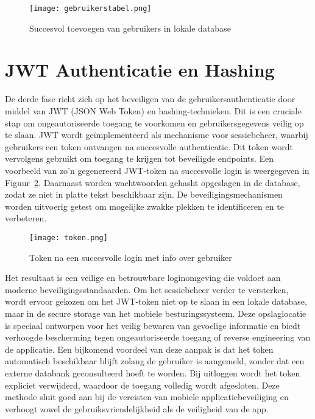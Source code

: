 \begin{figure}[H]
    \centering
    \texttt{[image: gebruikerstabel.png]}
    \caption{Succesvol toevoegen van gebruikers in lokale database}
    \label{fig:gebruikerstabel}
\end{figure}

\section{JWT Authenticatie en Hashing}

De derde fase richt zich op het beveiligen van de gebruikersauthenticatie door middel van JWT (JSON Web Token) en hashing-technieken. Dit is een cruciale stap om ongeautoriseerde toegang te voorkomen en gebruikersgegevens veilig op te slaan. JWT wordt geïmplementeerd als mechanisme voor sessiebeheer, waarbij gebruikers een token ontvangen na succesvolle authenticatie. Dit token wordt vervolgens gebruikt om toegang te krijgen tot beveiligde endpoints. Een voorbeeld van zo’n gegenereerd JWT-token na succesvolle login is weergegeven in Figuur~\ref{fig:token}. Daarnaast worden wachtwoorden gehasht opgeslagen in de database, zodat ze niet in platte tekst beschikbaar zijn. De beveiligingsmechanismen worden uitvoerig getest om mogelijke zwakke plekken te identificeren en te verbeteren. \\

\begin{figure}[H]
    \centering
    \texttt{[image: token.png]}
    \caption{Token na een succesvolle login met info over gebruiker}
    \label{fig:token}
\end{figure}

Het resultaat is een veilige en betrouwbare loginomgeving die voldoet aan moderne beveiligingsstandaarden. Om het sessiebeheer verder te versterken, wordt ervoor gekozen om het JWT-token niet op te slaan in een lokale database, maar in de secure storage van het mobiele besturingssysteem. Deze opslaglocatie is speciaal ontworpen voor het veilig bewaren van gevoelige informatie en biedt verhoogde bescherming tegen ongeautoriseerde toegang of reverse engineering van de applicatie. Een bijkomend voordeel van deze aanpak is dat het token automatisch beschikbaar blijft zolang de gebruiker is aangemeld, zonder dat een externe databank geconsulteerd hoeft te worden. Bij uitloggen wordt het token expliciet verwijderd, waardoor de toegang volledig wordt afgesloten. Deze methode sluit goed aan bij de vereisten van mobiele applicatiebeveiliging en verhoogt zowel de gebruiksvriendelijkheid als de veiligheid van de app.

